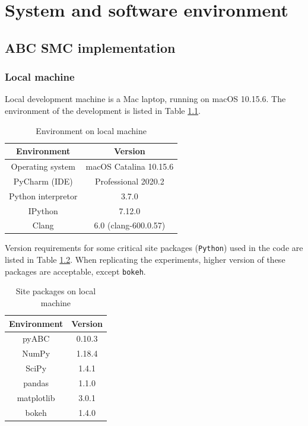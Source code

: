 \appendix

\chapter{System and software environment}

\section{ABC SMC implementation}

\subsection{Local machine}

Local development machine is a Mac laptop, running on macOS 10.15.6. The environment of the development is listed in Table \ref{table:local_macine}.

\begin{table}[H]
    \centering
    \begin{tabular}{|c c|}
        \hline
        Environment        & Version                \\ [0.5ex]
        \hline\hline
        Operating system   & macOS Catalina 10.15.6 \\
        PyCharm (IDE)      & Professional 2020.2    \\
        Python interpretor & 3.7.0                  \\
        IPython            & 7.12.0                 \\
        Clang              & 6.0 (clang-600.0.57)   \\
        \hline
    \end{tabular}
    \caption{Environment on local machine}
    \label{table:local_macine}
\end{table}

Version requirements for some critical site packages (\verb|Python|) used in the code are listed in Table \ref{table:local_package}. When replicating the experiments, higher version of these packages are acceptable, except \verb|bokeh|.

\begin{table}
    \centering
    \begin{tabular}{|c c|}
        \hline
        Environment & Version \\ [0.5ex]
        \hline\hline
        pyABC       & 0.10.3  \\
        NumPy       & 1.18.4  \\
        SciPy       & 1.4.1   \\
        pandas      & 1.1.0   \\
        matplotlib  & 3.0.1   \\
        bokeh       & 1.4.0   \\
        \hline
    \end{tabular}
    \caption{Site packages on local machine}
    \label{table:local_package}
\end{table}

